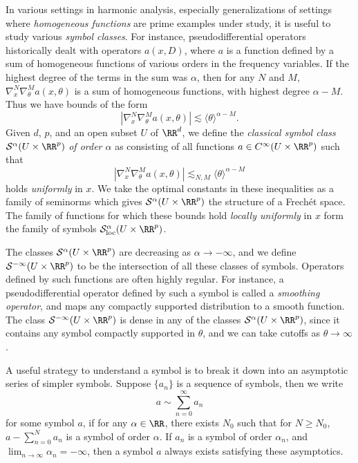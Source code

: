 In various settings in harmonic analysis, especially generalizations of settings where \emph{homogeneous functions} are prime examples under study, it is useful to study various \emph{symbol classes}. For instance, pseudodifferential operators historically dealt with operators $a(x,D)$, where $a$ is a function defined by a sum of homogeneous functions of various orders in the frequency variables. If the highest degree of the terms in the sum was $\alpha$, then for any $N$ and $M$, $\nabla^N_x \nabla^M_\theta a(x,\theta)$ is a sum of homogeneous functions, with highest degree $\alpha - M$. Thus we have bounds of the form
%
\[ | \nabla^N_x \nabla^M_\theta a(x,\theta) | \lesssim \langle \theta \rangle^{\alpha - M}. \]
%
Given $d$, $p$, and an open subset $U$ of $\RR^d$, we define the \emph{classical symbol class} $\mathcal{S}^\alpha(U \times \RR^p)$ \emph{of order $\alpha$} as consisting of all functions $a \in C^\infty(U \times \RR^p)$ such that
%
\[ |\nabla^N_x \nabla^M_\theta a(x,\theta)| \lesssim_{N,M} \langle \theta \rangle^{\alpha - M} \]
%
holds \emph{uniformly} in $x$. We take the optimal constants in these inequalities as a family of seminorms which gives $\mathcal{S}^\alpha(U \times \RR^p)$ the structure of a Frech\'{e}t space. The family of functions for which these bounds hold \emph{locally uniformly} in $x$ form the family of symbols $\mathcal{S}^\alpha_{\text{loc}}(U \times \RR^p)$.

The classes $\mathcal{S}^\alpha(U \times \RR^p)$ are decreasing as $\alpha \to -\infty$, and we define $\mathcal{S}^{-\infty}(U \times \RR^p)$ to be the intersection of all these classes of symbols. Operators defined by such functions are often highly regular. For instance, a pseudodifferential operator defined by such a symbol is called a \emph{smoothing operator}, and maps any compactly supported distribution to a smooth function. The class $\mathcal{S}^{-\infty}(U \times \RR^p)$ is dense in any of the classes $\mathcal{S}^\alpha(U \times \RR^p)$, since it contains any symbol compactly supported in $\theta$, and we can take cutoffs as $\theta \to \infty$.

A useful strategy to understand a symbol is to break it down into an asymptotic series of simpler symbols. Suppose $\{ a_n \}$ is a sequence of symbols, then we write
%
\[ a \sim \sum_{n = 0}^\infty a_n \]
%
for some symbol $a$, if for any $\alpha \in \RR$, there exists $N_0$ such that for $N \geq N_0$, $a - \sum_{n = 0}^N a_n$ is a symbol of order $\alpha$. If $a_n$ is a symbol of order $\alpha_n$, and $\lim_{n \to \infty} \alpha_n = -\infty$, then a symbol $a$ always exists satisfying these asymptotics.

